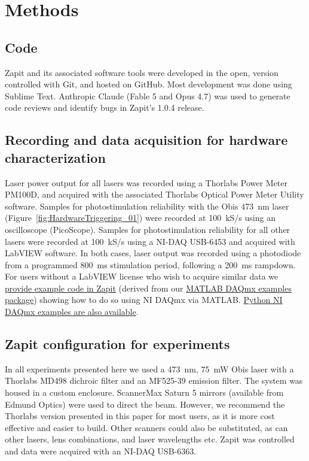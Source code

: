 \section{Methods}

\subsection{Code}
Zapit and its associated software tools were developed in the open, version controlled with Git, and hosted on GitHub.
Most development was done using Sublime Text.
Anthropic Claude (Fable 5 and Opus 4.7) was used to generate code reviews and identify bugs in Zapit's 1.0.4 release.

\subsection{Recording and data acquisition for hardware characterization}
Laser power output for all lasers was recorded using a Thorlabs Power Meter PM100D, and acquired with the associated Thorlabs Optical Power Meter Utility software.
Samples for photostimulation reliability with the Obis 473~nm laser (Figure~\ref{fig:HardwareTriggering_01}) were recorded at 100~kS/s using an oscilloscope (PicoScope).
Samples for photostimulation reliability for all other lasers were recorded at 100~kS/s using a NI-DAQ USB-6453 and acquired with LabVIEW software.
In both cases, laser output was recorded using a photodiode from a programmed 800~ms stimulation period, following a 200~ms rampdown.
For users without a LabVIEW license who wish to acquire similar data we \href{https://github.com/Zapit-Optostim/zapit/blob/main/development/recordWaveforms/waveformRecorder.m}{provide example code in Zapit} (derived from our \href{https://github.com/SWC-Advanced-Microscopy/MATLAB_DAQmx_examples}{MATLAB DAQmx examples package}) showing how to do so using NI DAQmx via MATLAB.
\href{https://github.com/SWC-Advanced-Microscopy/Python_DAQmx_examples}{Python NI DAQmx examples are also available}.

\subsection{Zapit configuration for experiments}
In all experiments presented here we used a 473~nm, 75~mW Obis laser with a Thorlabs MD498 dichroic filter and an MF525-39 emission filter.
The system was housed in a custom enclosure.
ScannerMax Saturn 5 mirrors (available from Edmund Optics) were used to direct the beam.
However, we recommend the Thorlabs version presented in this paper for most users, as it is more cost effective and easier to build.
Other scanners could also be substituted, as can other lasers, lens combinations, and laser wavelengths etc.
Zapit was controlled and data were acquired with an NI-DAQ USB-6363.

